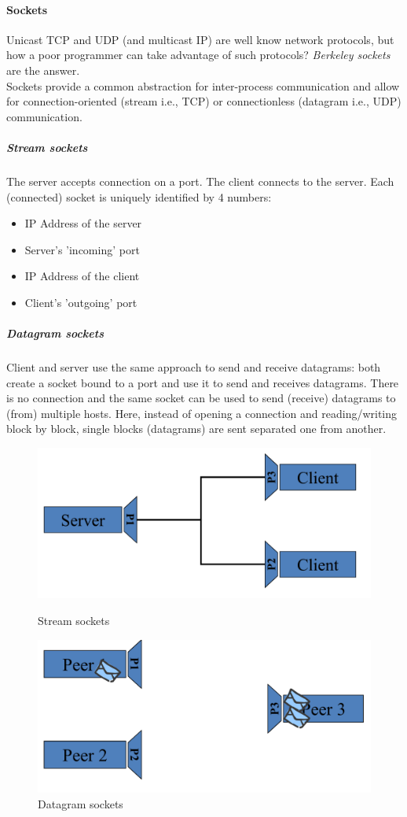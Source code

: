 \documentclass[10pt,a4paper]{article}
\begin{document}
\paragraph{Sockets}
Unicast TCP and UDP (and multicast IP) are well know network protocols, but how a poor programmer can take advantage of such protocols? \textit{Berkeley sockets} are the answer. \\ 
Sockets provide a common abstraction for inter-process communication and allow for connection-oriented (stream i.e., TCP) or connectionless (datagram i.e., UDP) communication.
\subparagraph{Stream sockets}
The server accepts connection on a port. The client connects to the server. Each (connected) socket is uniquely identified by 4 numbers:
\begin{itemize}
	\item IP Address of the server
	\item Server's 'incoming' port
	\item IP Address of the client
	\item Client's 'outgoing' port
\end{itemize}
\subparagraph{Datagram sockets}
Client and server use the same approach to send and receive datagrams: both create a socket bound to a port and use it to send and receives datagrams. There is no connection and the same socket can be used to send (receive) datagrams to (from) multiple hosts. Here, instead of opening a connection and reading/writing block by block, single blocks (datagrams) are sent separated one from another. \\
\begin{figure}[h!]
\centering
\begin{minipage}{.5\textwidth}
  \includegraphics[width=.7\linewidth]{images/stream-sockets.png}
  \caption{Stream sockets}
  \label{fig:stream}
\end{minipage}%
\begin{minipage}{.5\textwidth}
  \includegraphics[width=.7\linewidth]{images/datagram-sockets.png}
   \caption{Datagram sockets}
  \label{fig:datagram-sockets}
\end{minipage}
\end{figure} \\
\end{document}
